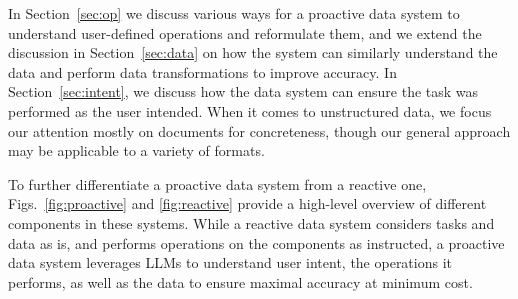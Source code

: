 \smallskip
\noindent In Section~\ref{sec:op} 
we discuss various ways for a proactive 
data system to understand 
user-defined operations and reformulate them, 
and we extend the discussion in Section~\ref{sec:data} 
on how the system can similarly understand the data 
and perform data transformations to improve accuracy. 
In Section~\ref{sec:intent}, we discuss how 
the data system can ensure the task 
was performed as the user intended.   
When it comes to unstructured data, we
focus our attention mostly on documents
for concreteness,
though our general approach may be applicable
to a variety of formats.

\smallskip
\noindent
To further differentiate a proactive data system 
from a reactive one, Figs.~\ref{fig:proactive} 
and \ref{fig:reactive} provide a high-level overview 
of different components in these systems. 
While a reactive data system considers tasks and data as is, 
and performs operations on the components as instructed, 
a proactive data system leverages LLMs to understand 
user intent, 
the operations it performs, as well as 
the data to ensure maximal accuracy at minimum cost.   





